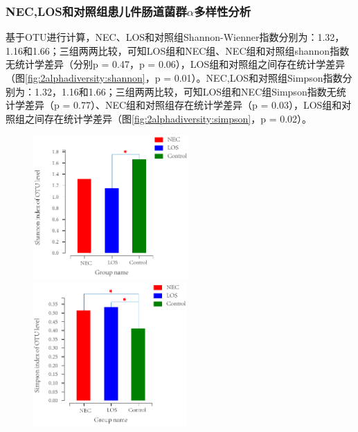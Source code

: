 {{    \subsubsection{NEC,LOS和对照组患儿件肠道菌群$\alpha$多样性分析}
      基于OTU进行计算，NEC、LOS和对照组Shannon-Wienner指数分别为：1.32，1.16和1.66；三组两两比较，可知LOS组和NEC组、NEC组和对照组shannon指数无统计学差异（分别p = 0.47，p = 0.06），LOS组和对照组之间存在统计学差异（图\ref{fig:2alphadiversity:shannon}，p = 0.01）。NEC,LOS和对照组Simpson指数分别为：1.32，1.16和1.66；三组两两比较，可知LOS组和NEC组Simpson指数无统计学差异（p = 0.77）、NEC组和对照组存在统计学差异（p = 0.03），LOS组和对照组之间存在统计学差异（图\ref{fig:2alphadiversity:simpson}，p = 0.02）。
      \begin{figure}[!htp]
        \centering
            {\includegraphics[height=5.5cm]{figure/2shannon.pdf}}
            \hspace{4em}
            {\includegraphics[height=5.5cm]{figure/2simpson.pdf}}
        \label{fig:2alphadiversity}
      \end{figure}
}}
